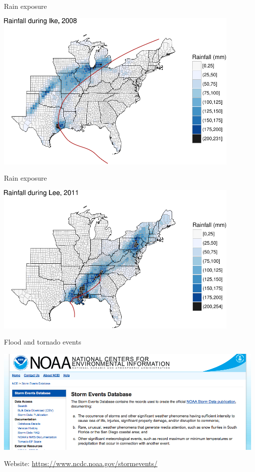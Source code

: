 \documentclass[ignorenonframetext,]{beamer}
\begin{document}
\begin{frame}{Rain exposure}

\begin{center}\includegraphics[width=0.9\textwidth]{anderson_jan18_files/figure-beamer/ike_rain_example-1} \end{center}

\end{frame}

\begin{frame}{Rain exposure}

\begin{center}\includegraphics[width=0.9\textwidth]{anderson_jan18_files/figure-beamer/lee_rain_example-1} \end{center}

\end{frame}

\begin{frame}{Flood and tornado events}

\includegraphics[width=\textwidth]{noaastormevents}

Website: \url{https://www.ncdc.noaa.gov/stormevents/}

\end{frame}
\end{document}
